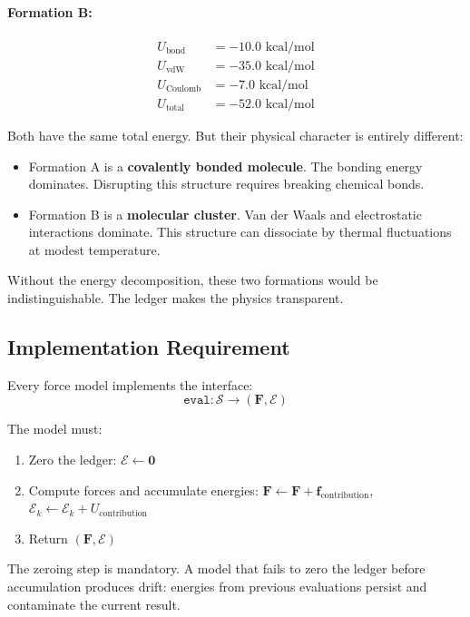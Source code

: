 \documentclass[11pt]{article}
\begin{document}
\paragraph{Formation B:}
\begin{align*}
U_{\text{bond}} &= -10.0 \text{ kcal/mol} \\
U_{\text{vdW}} &= -35.0 \text{ kcal/mol} \\
U_{\text{Coulomb}} &= -7.0 \text{ kcal/mol} \\
U_{\text{total}} &= -52.0 \text{ kcal/mol}
\end{align*}

Both have the same total energy. But their physical character is entirely different:

\begin{itemize}
\item Formation A is a \textbf{covalently bonded molecule}. The bonding energy dominates. Disrupting this structure requires breaking chemical bonds.
\item Formation B is a \textbf{molecular cluster}. Van der Waals and electrostatic interactions dominate. This structure can dissociate by thermal fluctuations at modest temperature.
\end{itemize}

Without the energy decomposition, these two formations would be indistinguishable. The ledger makes the physics transparent.

\subsection{Implementation Requirement}

Every force model implements the interface:
\begin{equation}
\texttt{eval}: \mathcal{S} \to (\mathbf{F}, \mathcal{E})
\end{equation}

The model must:
\begin{enumerate}
\item Zero the ledger: $\mathcal{E} \gets \mathbf{0}$
\item Compute forces and accumulate energies: $\mathbf{F} \gets \mathbf{F} + \mathbf{f}_{\text{contribution}}$, $\mathcal{E}_k \gets \mathcal{E}_k + U_{\text{contribution}}$
\item Return $(\mathbf{F}, \mathcal{E})$
\end{enumerate}

The zeroing step is mandatory. A model that fails to zero the ledger before accumulation produces drift: energies from previous evaluations persist and contaminate the current result.
\end{document}
